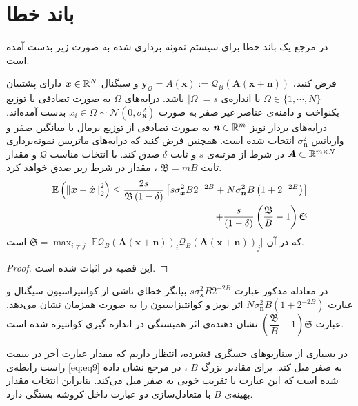 \section{باند خطا}
در مرجع
\cite{laska2012regime}
یک باند خطا برای سیستم نمونه برداری شده به صورت زیر بدست آمده است.
\begin{theorem}
\label{thorem:thm1}
فرض کنید، 
$\bm{y}_{\mathcal{Q}} =A(\bm{x}):= \mathcal{Q}_{B}\left(\bm{A}(\bm{x}+\bm{n})\right)$
و سیگنال
$\bm{x}\in \mathbb{R}^N$
دارای  پشتیبان
$\Omega \in \lbrace 1,\cdots,N\rbrace$
با اندازه‌ی 
$|\Omega|=s$
باشد. درایه‌های 
$\Omega$
به صورت تصادفی با توزیع یکنواخت و دامنه‌ی عناصر غیر صفر به صورت 
$ x_{i} \in \Omega \sim \mathcal{N}\left( 0,\sigma_{\bm{x}}^{2} \right) $
بدست آمده‌اند. درایه‌های بردار نویز
$\bm{n}\in \mathbb{R}^m$ 
به صورت تصادفی از توزیع نرمال با میانگین صفر و واریانس
$\sigma^{2}_{\bm{n}}$
انتخاب شده است. همچنین فرض کنید که درایه‌های ماتریس نمونه‌برداری
$\bm{A}\subset \mathbb{R}^{m\times N}$
در شرط 
از مرتبه‌ی
$s$
و ثابت
$\delta$
صدق کند. با انتخاب مناسب 
$\mathcal{Q}$
 و مقدار ثابت 
$\mathfrak{B}=mB$
، مقدار 
در شرط زیر صدق خواهد کرد.
\begin{align}
\label{eq:eq9}
\mathbb{E}\left( \left\lVert\bm{x}-\hat{\bm{x}}\right\rVert_{2}^{2} \right) \leq \dfrac{2s}{\mathfrak{B}\left( 1-\delta\right)} \left[ s\sigma^{2}_{\bm{x}}B2^{-2B}+N\sigma^{2}_{\bm{n}}B\left(1+2^{-2B}\right)\right]\\ \nonumber
\qquad \qquad+\dfrac{s}{\left( 1-\delta\right)}\left(\dfrac{\mathfrak{B}}{B}-1\right)\mathfrak{S}
\end{align}
که در آن 
$ \mathfrak{S}=\max_{i\neq j}\vert \mathbb{E}\mathcal{Q}_{B}\left(\bm{A}(\bm{x+n})\right)_{i}\mathcal{Q}_{B}\left(\bm{A}(\bm{x+n})\right)_{j}\vert $
است.
\end{theorem}
\begin{proof}
 این قضیه در 
\cite{laska2012regime}
اثبات شده است.
\end{proof}
در معادله مذکور عبارت 
$ s\sigma^{2}_{\bm{x}}B2^{-2B} $
بیانگر خطای ناشی از کوانتیزاسیون سیگنال و عبارت 
$ N\sigma^{2}_{\bm{n}}B\left(1+2^{-2B}\right) $
اثر نویز و کوانتیزاسیون را به صورت همزمان نشان می‌دهد. عبارت 
$ \left(\dfrac{\mathfrak{B}}{B}-1\right)\mathfrak{S} $
نشان دهنده‌ی اثر همبستگی در اندازه گیری کوانتیزه شده است.

در بسیاری از سناریو‌های حسگری فشرده، انتظار داریم که مقدار عبارت آخر در سمت راست رابطه‌ی 
\eqref{eq:eq9}
به صفر میل کند. برای مقادیر بزرگ 
$B$
، در مرجع 
\cite{gray1998quantization}
نشان داده شده است که این عبارت با تقریب خوبی به صفر میل می‌کند. بنابراین انتخاب مقدار بهینه‌ی 
$B$
با متعادل‌سازی دو عبارت داخل کروشه بستگی دارد. 

